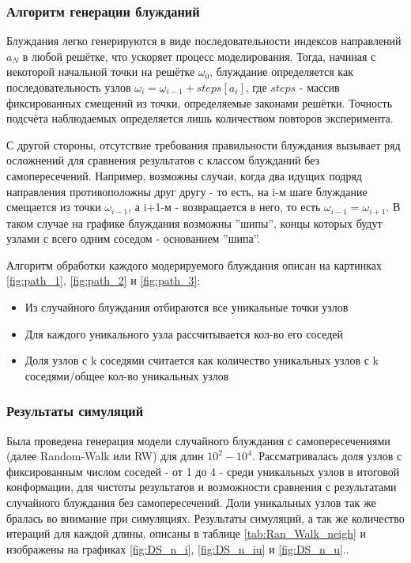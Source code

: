 \subsubsection{Алгоритм генерации блужданий}

Блуждания легко генерируются в виде последовательности индексов направлений $ {a_{N}} $ в любой решётке, что ускоряет процесс моделирования. 
Тогда, начиная с некоторой начальной точки на решётке $\omega_{0}$, блуждание определяется как последовательность узлов $ 
\omega_{i} = \omega_{i-1} + steps\left[a_{i}\right] $, где $steps$ - массив фиксированных смещений из точки, определяемые законами решётки. 
Точность подсчёта наблюдаемых определяется лишь количеством повторов эксперимента.

С другой стороны, отсутствие требования правильности блуждания вызывает ряд осложнений для сравнения результатов с классом блужданий без самопересечений. 
Например, возможны случаи, когда два идущих подряд направления противоположны друг другу - то есть, на i-м шаге блуждание смещается из точки $\omega_{i-1}$, а i+1-м - возвращается в него, то есть $\omega_{i-1} = \omega_{i+1}$.
В таком случае на графике блуждания возможны ''шипы'', концы которых будут узлами с всего одним соседом - основанием ''шипа''. 



Алгоритм обработки каждого модерируемого блуждания описан на картинках \ref{fig:path_1}, \ref{fig:path_2} и \ref{fig:path_3}:
\begin{itemize}
    \item Из случайного блуждания отбираются все уникальные точки узлов
    \item Для каждого уникального узла рассчитывается кол-во его соседей 
    \item Доля узлов с k соседями считается как {количество уникальных узлов с k соседями}/{общее кол-во уникальных узлов}
\end{itemize}

\subsubsection{Результаты симуляций}

Была проведена генерация модели случайного блуждания с самопересечениями (далее Random-Walk или RW) для длин $10^{2}-10^{4}$. 
Рассматривалась доля узлов с фиксированным числом соседей - от 1 до 4 - среди уникальных узлов в итоговой конформации, для чистоты результатов и возможности сравнения с результатами случайного блуждания без самопересечений.
Доли уникальных узлов так же бралась во внимание при симуляциях. 
Результаты симуляций, а так же количество итераций для каждой длины, описаны в таблице \ref{tab:Ran_Walk_neigh} и изображены на графиках \ref{fig:DS_n_i}, \ref{fig:DS_n_iu} и \ref{fig:DS_n_u}.\footnotemark{}.

